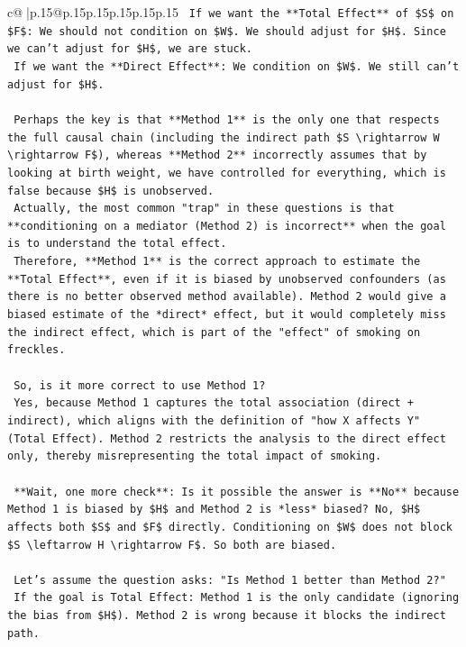 \documentclass{article}
\begin{document}
{\begin{supertabular}{c@{$\;$}|p{.15\linewidth}@{}p{.15\linewidth}p{.15\linewidth}p{.15\linewidth}p{.15\linewidth}p{.15\linewidth}}
{{{\texttt{    If we want the **Total Effect** of \$S\$ on \$F\$: We should not condition on \$W\$. We should adjust for \$H\$. Since we can't adjust for \$H\$, we are stuck.} \\
\texttt{    If we want the **Direct Effect**: We condition on \$W\$. We still can't adjust for \$H\$.} \\
\\ 
\texttt{    Perhaps the key is that **Method 1** is the only one that respects the full causal chain (including the indirect path \$S \textbackslash{}rightarrow W \textbackslash{}rightarrow F\$), whereas **Method 2** incorrectly assumes that by looking at birth weight, we have controlled for everything, which is false because \$H\$ is unobserved.} \\
\texttt{    Actually, the most common "trap" in these questions is that **conditioning on a mediator (Method 2) is incorrect** when the goal is to understand the total effect.} \\
\texttt{    Therefore, **Method 1** is the correct approach to estimate the **Total Effect**, even if it is biased by unobserved confounders (as there is no better observed method available). Method 2 would give a biased estimate of the *direct* effect, but it would completely miss the indirect effect, which is part of the "effect" of smoking on freckles.} \\
\\ 
\texttt{    So, is it more correct to use Method 1?} \\
\texttt{    Yes, because Method 1 captures the total association (direct + indirect), which aligns with the definition of "how X affects Y" (Total Effect). Method 2 restricts the analysis to the direct effect only, thereby misrepresenting the total impact of smoking.} \\
\\ 
\texttt{    **Wait, one more check**: Is it possible the answer is **No** because Method 1 is biased by \$H\$ and Method 2 is *less* biased? No, \$H\$ affects both \$S\$ and \$F\$ directly. Conditioning on \$W\$ does not block \$S \textbackslash{}leftarrow H \textbackslash{}rightarrow F\$. So both are biased.} \\
\\ 
\texttt{    Let's assume the question asks: "Is Method 1 better than Method 2?"} \\
\texttt{    If the goal is Total Effect: Method 1 is the only candidate (ignoring the bias from \$H\$). Method 2 is wrong because it blocks the indirect path.} \\
}}}
\end{supertabular}}
\end{document}
